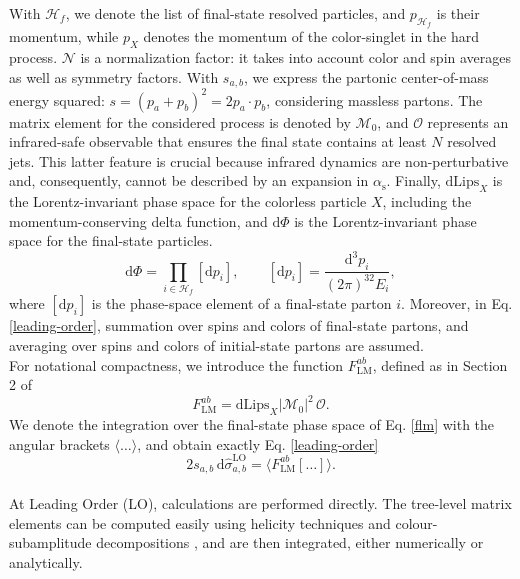 \documentclass[a4paper, 12pt]{book}
\begin{document}
With $\mathcal{H}_f$, we denote the list of final-state resolved particles, and $p_{\mathcal{H}_f}$ is their momentum, while $p_X$ denotes the momentum of the color-singlet in the hard process. $\mathcal{N}$ is a normalization factor: it takes into account color and spin averages as well as symmetry factors. With $s_{a,b}$, we express the partonic center-of-mass energy squared: $s=(p_a+p_b)^2=2 p_a\cdot p_b$, considering massless partons. The matrix element for the considered process is denoted by $\mathcal{M}_0$, and $\mathcal{O}$ represents an infrared-safe observable that ensures the final state contains at least $N$ resolved jets. This latter feature is crucial because infrared dynamics are non-perturbative and, consequently, cannot be described by an expansion in $\alpha_\mathrm{s}$. Finally, $\mathrm{dLips}_X$ is the Lorentz-invariant phase space for the colorless particle $X$, including the momentum-conserving delta function, and $\mathrm{d}\Phi$ is the Lorentz-invariant phase space for the final-state particles.
\begin{equation}
    \mathrm{d}\Phi= \prod_{i \in \mathcal{H}_f} [\mathrm{d}p_i], \qquad [\mathrm{d}p_i]=\frac{\mathrm{d}^3p_i}{(2\pi)^32E_i},
\end{equation}
where $[\mathrm{d}p_i]$ is the phase-space element of a final-state parton $i$. Moreover, in Eq. \ref{leading-order}, summation over spins and colors of final-state partons, and averaging over spins and colors of initial-state partons are assumed.  \\
For notational compactness, we introduce the function $F^{ab}_{\mathrm{LM}}$, defined as in Section 2 of \cite{Devoto:2023rpv}
\begin{equation}
    F^{ab}_{\mathrm{LM}} = \mathrm{dLips}_X |\mathcal{M}_0|^2 \, \mathcal{O}.
    \label{flm}
\end{equation}
We denote the integration over the final-state phase space of Eq. \ref{flm} with the angular brackets $\langle\dots\rangle$, and obtain exactly Eq. \ref{leading-order}
\begin{equation}
    2s_{a,b} \, \text{d} \hat{\sigma}_{a,b}^{\text{LO}} = \langle F^{ab}_{\mathrm{LM}}[\dots] \rangle.
\end{equation} \\
At Leading Order (LO), calculations are performed directly. The tree-level matrix elements can be computed easily using helicity techniques and colour-subamplitude decompositions \cite{Altarelli:1977zs}, and are then integrated, either numerically or analytically. \\
\end{document}
